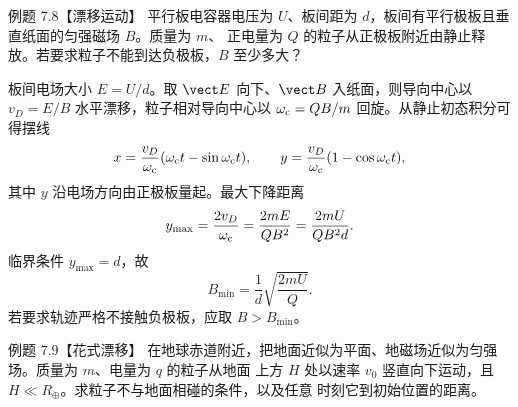 \Needspace{0.42\textheight}
\begin{origexamplebox}{例题 7.8【漂移运动】}
平行板电容器电压为 $U$、板间距为 $d$，板间有平行极板且垂直纸面的匀强磁场 $B$。质量为 $m$、
正电量为 $Q$ 的粒子从正极板附近由静止释放。若要求粒子不能到达负极板，$B$ 至少多大？

\begin{center}
\end{center}
\label{fig:em22-question-8}
\end{origexamplebox}

\begin{xesolution}
板间电场大小 $E=U/d$。取 $\vect E$ 向下、$\vect B$ 入纸面，则导向中心以
$v_D=E/B$ 水平漂移，粒子相对导向中心以 $\omega_{\rm c}=QB/m$ 回旋。从静止初态积分可得摆线
\[
  x=\frac{v_D}{\omega_{\rm c}}(\omega_{\rm c}t-\sin\omega_{\rm c}t),
  \qquad
  y=\frac{v_D}{\omega_{\rm c}}(1-\cos\omega_{\rm c}t),
\]
其中 $y$ 沿电场方向由正极板量起。最大下降距离
\begin{equation}
  y_{\max}=\frac{2v_D}{\omega_{\rm c}}
  =\frac{2mE}{QB^2}=\frac{2mU}{QB^2d}.
\end{equation}
临界条件 $y_{\max}=d$，故
\begin{equation}
  \boxed{B_{\min}=\frac1d\sqrt{\frac{2mU}{Q}}}.
\end{equation}
若要求轨迹严格不接触负极板，应取 $B>B_{\min}$。

\crossedFieldCycloidDiagram
\end{xesolution}

\Needspace{0.46\textheight}
\begin{origexamplebox}{例题 7.9【花式漂移】}
在地球赤道附近，把地面近似为平面、地磁场近似为匀强场。质量为 $m$、电量为 $q$ 的粒子从地面
上方 $H$ 处以速率 $v_0$ 竖直向下运动，且 $H\ll R_\oplus$。求粒子不与地面相碰的条件，以及任意
时刻它到初始位置的距离。
\end{origexamplebox}

